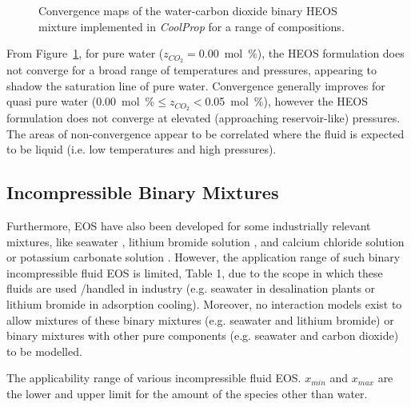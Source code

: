     \begin{figure}[H]
        \centering
        
        \caption{Convergence maps of the water-carbon dioxide binary \ac{HEOS} mixture implemented in \emph{CoolProp} for a range of compositions.}
        \label{fig:wat_co2_calcmap}
    \end{figure}

    From Figure~\ref{fig:wat_co2_calcmap}, for pure water (\(z_{CO_2}=\)\qty{0.00}{\mol\percent}), the \ac{HEOS} formulation does not converge for a broad range of temperatures and pressures, appearing to shadow the saturation line of pure water. Convergence generally improves for quasi pure water (\qty{0.00}{\mol\percent}\(\leq z_{CO_2}<\)\qty{0.05}{\mol\percent}), however the \ac{HEOS} formulation does not converge at elevated (approaching reservoir-like) pressures. The areas of non-convergence appear to be correlated where the fluid is expected to be liquid (i.e. low temperatures and high pressures). 

    \subsection{Incompressible Binary Mixtures}
    \label{sec:incompressible_fluids}
        Furthermore, \ac{EOS} have also been developed for some industrially relevant mixtures, like seawater \cite{Sharqawy2010}, lithium bromide solution \cite{Patek2006}, and calcium chloride solution \cite{Preisegger2010} or potassium carbonate solution \cite{Melinder2010}. However, the application range of such binary incompressible fluid \ac{EOS} is limited, Table 1, due to the scope in which these fluids are used /handled in industry (e.g. seawater in desalination plants or lithium bromide in adsorption cooling). Moreover, no interaction models exist to allow mixtures of these binary mixtures (e.g. seawater and lithium bromide) or binary mixtures with other pure components (e.g. seawater and carbon dioxide) to be modelled.

        \begin{table}[H]
            \caption[The applicability range of various incompressible fluid \ac{EOS}.]{The applicability range of various incompressible fluid \ac{EOS}. \(x_{min}\) and \(x_{max}\) are the lower and upper limit for the amount of the species other than water.}
            \centering 
            \label{table:IncompressibleEOS}
                    
            \\[10pt]
        \end{table}
    
